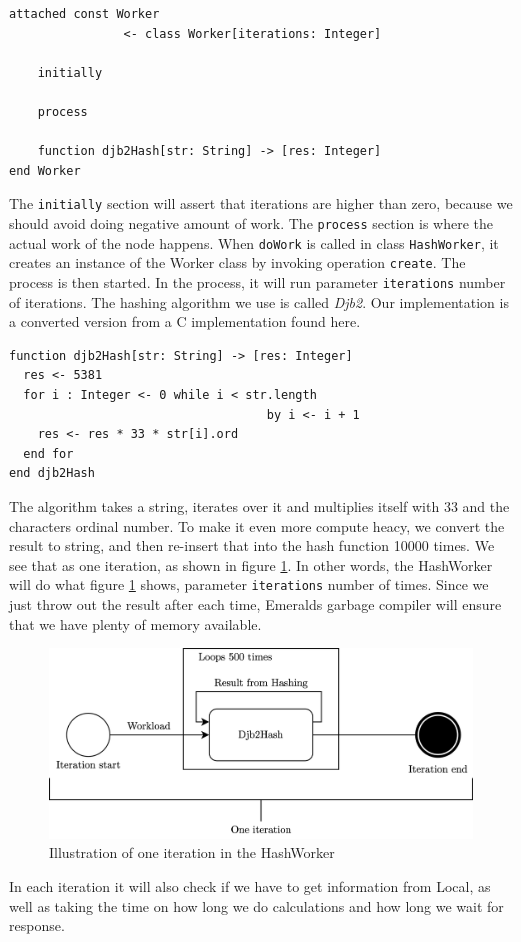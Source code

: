 \begin{minipage}{\linewidth}
\begin{lstlisting}[language=emerald]
attached const Worker 
                <- class Worker[iterations: Integer]
                
    initially
    
    process
    
    function djb2Hash[str: String] -> [res: Integer]
end Worker
\end{lstlisting}
\end{minipage}
The \verb|initially| section will assert that iterations are higher than zero, because we should avoid doing negative amount of work. The \verb|process| section is where the actual work of the node happens. When \verb|doWork| is called in class \verb|HashWorker|, it creates an instance of the Worker class by invoking operation \verb|create|. The process is then started. In the process, it will run parameter \verb|iterations| number of iterations. The hashing algorithm we use is called \textit{Djb2}. Our implementation is a converted version from a C implementation found here\cite{noauthor_hash_nodate}. 
\begin{lstlisting}[language=emerald]
function djb2Hash[str: String] -> [res: Integer]
  res <- 5381
  for i : Integer <- 0 while i < str.length 
                                    by i <- i + 1
    res <- res * 33 * str[i].ord
  end for
end djb2Hash
\end{lstlisting}
The algorithm takes a string, iterates over it and multiplies itself with 33 and the characters ordinal number. To make it even more compute heacy, we convert the result to string, and then re-insert that into the hash function 10000 times. We see that as one iteration, as shown in figure \ref{fig:Hashing_algorithm_iteration}. In other words, the HashWorker will do what figure \ref{fig:Hashing_algorithm_iteration} shows, parameter \verb|iterations| number of times. Since we just throw out the result after each time, Emeralds garbage compiler will ensure that we have plenty of memory available. 
\begin{figure}[t]
    \centering
    \includegraphics[scale=0.9]{chapters/implementation/figures/Iteration.png}
    \caption{Illustration of one iteration in the HashWorker}
    \label{fig:Hashing_algorithm_iteration}
\end{figure}
In each iteration it will also check if we have to get information from Local, as well as taking the time on how long we do calculations and how long we wait for response.




